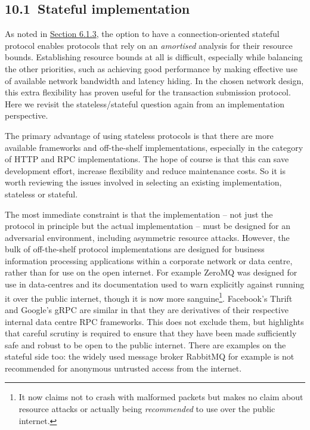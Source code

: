 \documentclass[]{article}
\begin{document}
\hypertarget{stateful-implementation}{%
\subsection{​10.1​~Stateful
implementation}\label{stateful-implementation}}

As noted in \protect\hyperlink{stateful-chain-following}{{Section
6.1.3}}, the option to have a connection-oriented stateful protocol
enables protocols that rely on an \emph{amortised} analysis for their
resource bounds. Establishing resource bounds at all is difficult,
especially while balancing the other priorities, such as achieving good
performance by making effective use of available network bandwidth and
latency hiding. In the chosen network design, this extra flexibility has
proven useful for the transaction submission protocol. Here we revisit
the stateless/stateful question again from an implementation
perspective.

The primary advantage of using stateless protocols is that there are
more available frameworks and off-the-shelf implementations, especially
in the category of HTTP and RPC implementations. The hope of course is
that this can save development effort, increase flexibility and reduce
maintenance costs. So it is worth reviewing the issues involved in
selecting an existing implementation, stateless or stateful.

The most immediate constraint is that the implementation -- not just the
protocol in principle but the actual implementation -- must be designed
for an adversarial environment, including asymmetric resource attacks.
However, the bulk of off-the-shelf protocol implementations are designed
for business information processing applications within a corporate
network or data centre, rather than for use on the open internet. For
example ZeroMQ was designed for use in data-centres and its
documentation used to warn explicitly against running it over the public
internet, though it is now more sanguine\footnote{It now claims not to
  crash with malformed packets but makes no claim about resource attacks
  or actually being \emph{recommended} to use over the public internet.}.
Facebook's Thrift and Google's gRPC are similar in that they are
derivatives of their respective internal data centre RPC frameworks.
This does not exclude them, but highlights that careful scrutiny is
required to ensure that they have been made sufficiently safe and robust
to be open to the public internet. There are examples on the stateful
side too: the widely used message broker RabbitMQ for example is not
recommended for anonymous untrusted access from the internet.
\end{document}
